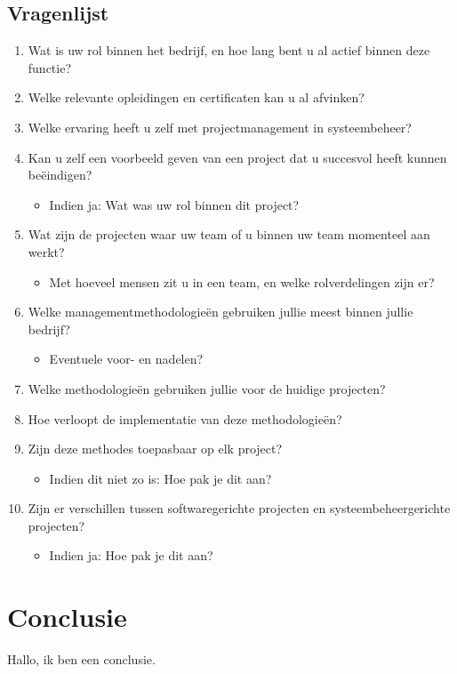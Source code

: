 \documentclass{article}
\begin{document}
    \subsection{Vragenlijst}
    \begin{enumerate}
        \item Wat is uw rol binnen het bedrijf, en hoe lang bent u al actief binnen deze functie?
        \item Welke relevante opleidingen en certificaten kan u al afvinken?
        \item Welke ervaring heeft u zelf met projectmanagement in systeembeheer?
        \item Kan u zelf een voorbeeld geven van een project dat u succesvol heeft kunnen beëindigen?
        \begin{itemize}
            \item \hspace{0.5cm} Indien ja: Wat was uw rol binnen dit project?
        \end{itemize}
        \item Wat zijn de projecten waar uw team of u binnen uw team momenteel aan werkt?
        \begin{itemize}
            \item \hspace{0.5cm} Met hoeveel mensen zit u in een team, en welke rolverdelingen zijn er?
        \end{itemize}
        \item Welke managementmethodologieën gebruiken jullie meest binnen jullie bedrijf?
        \begin{itemize}
            \item \hspace{0.5cm} Eventuele voor- en nadelen?
        \end{itemize}
        \item Welke methodologieën gebruiken jullie voor de huidige projecten?
        \item Hoe verloopt de implementatie van deze methodologieën?
        \item Zijn deze methodes toepasbaar op elk project?
        \begin{itemize}
            \item \hspace{0.5cm} Indien dit niet zo is: Hoe pak je dit aan?
        \end{itemize}
        \item Zijn er verschillen tussen softwaregerichte projecten en systeembeheergerichte projecten?
        \begin{itemize}
            \item \hspace{0.5cm} Indien ja: Hoe pak je dit aan?
        \end{itemize}
    \end{enumerate}

    \section{Conclusie}
    
    Hallo, ik ben een conclusie.

    \newpage
    \printbibliography
\end{document}
